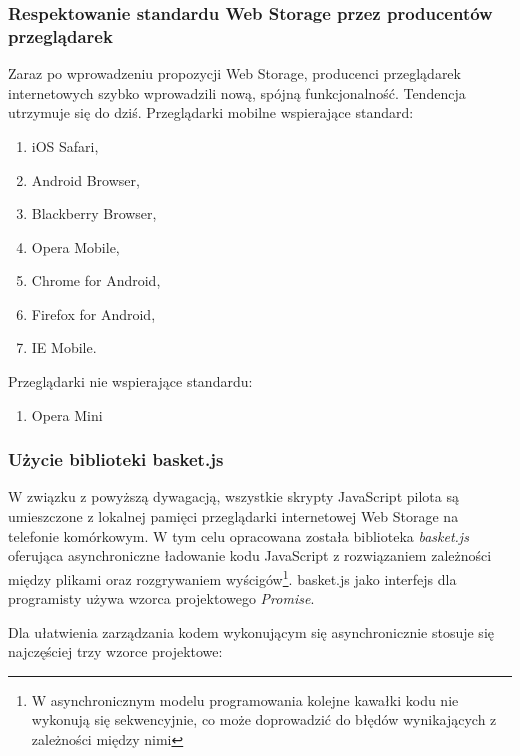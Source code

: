 \subsubsection{Respektowanie standardu Web Storage przez producentów przeglądarek}

Zaraz po wprowadzeniu propozycji Web Storage, producenci przeglądarek internetowych szybko wprowadzili nową, spójną funkcjonalność. Tendencja utrzymuje się do dziś. Przeglądarki mobilne wspierające standard\cite{caniuse-webstorage}:

\begin{enumerate}
  \item iOS Safari,
  \item Android Browser,
  \item Blackberry Browser,
  \item Opera Mobile,
  \item Chrome for Android,
  \item Firefox for Android,
  \item IE Mobile.
\end{enumerate}

Przeglądarki nie wspierające standardu:

\begin{enumerate}
  \item Opera Mini
\end{enumerate}

\subsubsection{Użycie biblioteki basket.js}

W związku z powyższą dywagacją, wszystkie skrypty JavaScript pilota są umieszczone z lokalnej pamięci przeglądarki internetowej Web Storage na telefonie komórkowym. W tym celu opracowana została biblioteka \emph{basket.js} oferująca asynchroniczne ładowanie kodu JavaScript z rozwiązaniem zależności między plikami oraz rozgrywaniem wyścigów\footnote{W asynchronicznym modelu programowania kolejne kawałki kodu nie wykonują się sekwencyjnie, co może doprowadzić do błędów wynikających z zależności między nimi}. basket.js jako interfejs dla programisty używa wzorca projektowego \emph{Promise}.

Dla ułatwienia zarządzania kodem wykonującym się asynchronicznie stosuje się najczęściej trzy wzorce projektowe:

